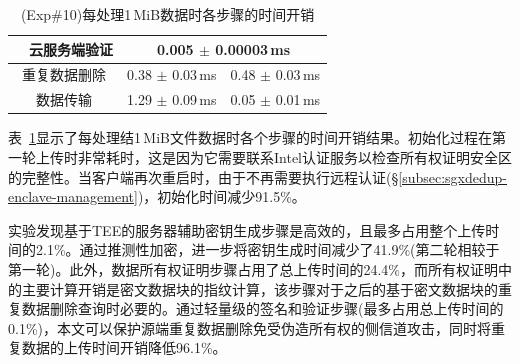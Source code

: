 \begin{table}[!htb]
\begin{tabular}{|c|c|c|c|}
                                                      & 云服务端验证                                                      & \multicolumn{2}{c|}{0.005 $\pm$ 0.00003\,ms } \\ \hline
        \multicolumn{2}{|c|}{重复数据删除}            & \multicolumn{1}{c|}{0.38 $\pm$ 0.03\,ms }                         & 0.48 $\pm$ 0.03\,ms                           \\ \hline
        \multicolumn{2}{|c|}{数据传输}                & \multicolumn{1}{c|}{1.29 $\pm$ 0.09\,ms }                         & 0.05 $\pm$ 0.01\,ms                           \\ \hline
    \end{tabular}
    \caption{(Exp\#10)每处理1\,MiB数据时各步骤的时间开销}
    \label{tab:sgxdedup-system-breakdown}
\end{table}

表~\ref{tab:sgxdedup-system-breakdown}显示了每处理结1\,MiB文件数据时各个步骤的时间开销结果。初始化过程在第一轮上传时非常耗时，这是因为它需要联系Intel认证服务以检查所有权证明安全区的完整性。当客户端再次重启时，由于不再需要执行远程认证(\S\ref{subsec:sgxdedup-enclave-management})，初始化时间减少91.5\%。

实验发现基于TEE的服务器辅助密钥生成步骤是高效的，且最多占用整个上传时间的2.1\%。通过推测性加密，\sysnameS 进一步将密钥生成时间减少了41.9\%(第二轮相较于第一轮)。此外，数据所有权证明步骤占用了总上传时间的24.4\%，而所有权证明中的主要计算开销是密文数据块的指纹计算，该步骤对于之后的基于密文数据块的重复数据删除查询时必要的。通过轻量级的签名和验证步骤(最多占用总上传时间的0.1\%)，本文可以保护源端重复数据删除免受伪造所有权的侧信道攻击，同时将重复数据的上传时间开销降低96.1\%。

